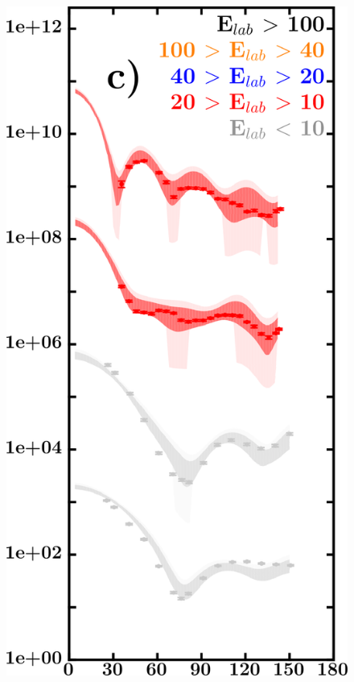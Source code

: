 \documentclass[twocolumn,secnumarabic,amssymb, nobibnotes, aps, prl,
superscriptaddress, nobalancelastpage]{revtex4}
\begin{document}
\begin{figure}[!htb]
\begin{minipage}{0.4\linewidth}
        \includegraphics[width=\linewidth]{figures/ca48_neutronElastic.png}
        \label{DOM_ca48_neutron_elastic}
    \end{minipage}
    \centering
    \begin{minipage}{0.4\linewidth}
        \centering

\end{minipage}
\end{figure}
\end{document}

